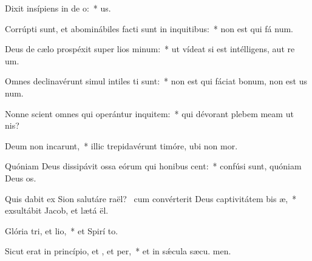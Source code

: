 \item Dixit insípiens in de o:~*   us.
\item Corrúpti sunt, et abominábiles facti sunt in inquitibus:~* non est qui fá num.
\item Deus de cælo prospéxit super lios minum:~* ut vídeat si est intélligens, aut re um.
\item Omnes declinavérunt simul intiles ti sunt:~* non est qui fáciat bonum, non est us  num.
\item Nonne scient omnes qui operántur inquitem:~* qui dévorant plebem meam ut  nis?
\item Deum non incarunt,~* illic trepidavérunt timóre, ubi non  mor.
\item Quóniam Deus dissipávit ossa eórum qui honibus cent:~* confúsi sunt, quóniam Deus  os.
\item Quis dabit ex Sion salutáre raël?~\pscross{} cum convérterit Deus captivitátem bis æ,~* exsultábit Jacob, et lætá ël.
\item Glória tri, et lio,~* et Spirí to.
\item Sicut erat in princípio, et , et per,~* et in sǽcula sæcu. men.
